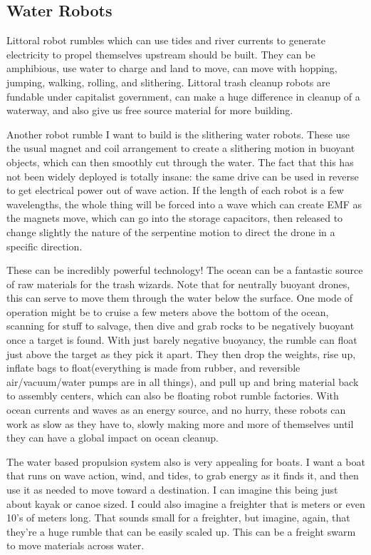 \subsection{Water Robots}\label{water-robots}

Littoral robot rumbles which can use tides and river currents to
generate electricity to propel themselves upstream should be built. They
can be amphibious, use water to charge and land to move, can move with
hopping, jumping, walking, rolling, and slithering. Littoral trash
cleanup robots are fundable under capitalist government, can make a huge
difference in cleanup of a waterway, and also give us free source
material for more building.

Another robot rumble I want to build is the slithering water robots.
These use the usual magnet and coil arrangement to create a slithering
motion in buoyant objects, which can then smoothly cut through the
water. The fact that this has not been widely deployed is totally
insane: the same drive can be used in reverse to get electrical power
out of wave action. If the length of each robot is a few wavelengths,
the whole thing will be forced into a wave which can create EMF as the
magnets move, which can go into the storage capacitors, then released to
change slightly the nature of the serpentine motion to direct the drone
in a specific direction.

These can be incredibly powerful technology! The ocean can be a
fantastic source of raw materials for the trash wizards. Note that for
neutrally buoyant drones, this can serve to move them through the water
below the surface. One mode of operation might be to cruise a few meters
above the bottom of the ocean, scanning for stuff to salvage, then dive
and grab rocks to be negatively buoyant once a target is found. With
just barely negative buoyancy, the rumble can float just above the
target as they pick it apart. They then drop the weights, rise up,
inflate bags to float(everything is made from rubber, and reversible
air/vacuum/water pumps are in all things), and pull up and bring
material back to assembly centers, which can also be floating robot
rumble factories. With ocean currents and waves as an energy source, and
no hurry, these robots can work as slow as they have to, slowly making
more and more of themselves until they can have a global impact on ocean
cleanup.

The water based propulsion system also is very appealing for boats. I
want a boat that runs on wave action, wind, and tides, to grab energy as
it finds it, and then use it as needed to move toward a destination. I
can imagine this being just about kayak or canoe sized. I could also
imagine a freighter that is meters or even 10's of meters long. That
sounds small for a freighter, but imagine, again, that they're a huge
rumble that can be easily scaled up. This can be a freight swarm to move
materials across water.

